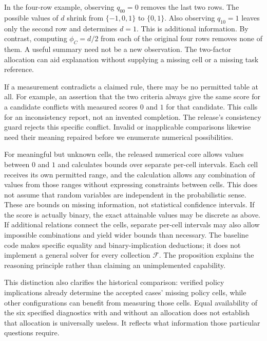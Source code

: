 In the four-row example, observing $q_{00}=0$ removes the last two rows. The
possible values of $d$ shrink from $\{-1,0,1\}$ to $\{0,1\}$. Also observing
$q_{10}=1$ leaves only the second row and determines $d=1$. This is additional
information. By contrast, computing $\phi_C=d/2$ from each of the original
four rows removes none of them. A useful summary need not be a new
observation. The two-factor allocation can aid explanation without supplying
a missing cell or a missing task reference.

If a measurement contradicts a claimed rule, there may be no permitted table
at all. For example, an assertion that the two criteria always give the same
score for a candidate conflicts with measured scores $0$ and $1$ for that
candidate. This calls for an inconsistency report, not an invented completion.
The release's consistency guard rejects this specific conflict. Invalid or
inapplicable comparisons likewise need their meaning repaired before we
enumerate numerical possibilities.

For meaningful but unknown cells, the released numerical core allows values
between $0$ and $1$ and calculates bounds over separate per-cell intervals.
Each cell receives its own permitted range, and the calculation allows any
combination of values from those ranges without expressing constraints
between cells. This does not assume that random variables are independent
in the probabilistic sense. These are bounds on missing information, not statistical confidence
intervals. If the score is actually binary, the exact attainable values may
be discrete as above. If additional relations connect the cells, separate
per-cell intervals may also allow impossible combinations and yield wider bounds than
necessary. The baseline code makes specific equality and binary-implication
deductions; it does not implement a general solver for every collection
$\mathcal F$. The proposition explains the reasoning principle rather than
claiming an unimplemented capability.

This distinction also clarifies the historical comparison: verified policy
implications already determine the accepted cases' missing policy cells,
while other configurations can benefit from measuring those cells. Equal
availability of the six specified diagnostics with and without an allocation
does not establish that allocation is universally useless. It reflects what
information those particular questions require.
